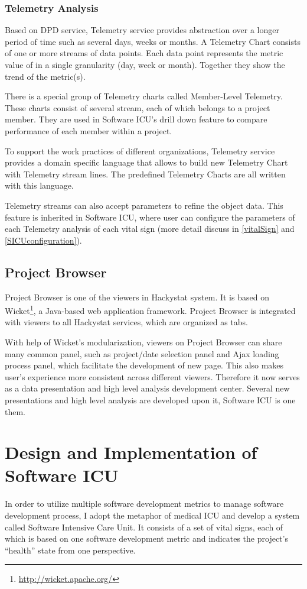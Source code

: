 \subsection{Telemetry Analysis}
Based on DPD service, Telemetry service provides abstraction over a longer period of time such as several days, weeks or months. A Telemetry Chart consists of one or more streams of data points. Each data point represents the metric value of in a single granularity (day, week or month). Together they show the trend of the metric(s).

There is a special group of Telemetry charts called Member-Level Telemetry. These charts consist of several stream, each of which belongs to a project member. They are used in Software ICU's drill down feature to compare performance of each member within a project. 

To support the work practices of different organizations, Telemetry service provides a domain specific language that allows to build new Telemetry Chart with Telemetry stream lines. The predefined Telemetry Charts are all written with this language.

Telemetry streams can also accept parameters to refine the object data. This feature is inherited in Software ICU, where user can configure the parameters of each Telemetry analysis of each vital sign (more detail discuss in \autoref{vitalSign} and \autoref{SICUconfiguration}).

\section {Project Browser}
Project Browser is one of the viewers in Hackystat system. It is based on Wicket\footnote{\url{http://wicket.apache.org/}}, a Java-based web application framework. Project Browser is integrated with viewers to all Hackystat services, which are organized as tabs. 

With help of Wicket's modularization, viewers on Project Browser can share many common panel, such as project/date selection panel and Ajax loading process panel, which facilitate the development of new page. This also makes user's experience more consistent across different viewers. Therefore it now serves as a data presentation and high level analysis development center. Several new presentations and high level analysis are developed upon it, Software ICU is one them.

\chapter{Design and Implementation of Software ICU}
In order to utilize multiple software development metrics to manage software development process, I adopt the metaphor of medical ICU and develop a system called Software Intensive Care Unit. It consists of a set of vital signs, each of which is based on one software development metric and indicates the project's ``health'' state from one perspective.

